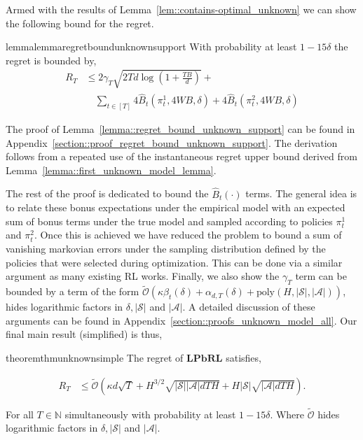Armed with the results of Lemma~\ref{lem::contains-optimal_unknown} we can show the following bound for the regret.

\begin{restatable}{lemma}{lemmaregretboundunknownsupport}\label{lemma::regret_bound_unknown_support}
With probability at least $1-15\delta$ the regret is bounded by,
\begin{align*}
    R_T &\leq 2\gamma_T \sqrt{2Td\log\left( 1 + \frac{TB}{d}\right) } + \\
    &\quad \sum_{t \in [T]} 4\widehat{B}_t(\pi_t^1, 4WB, \delta) + 4\widehat{B}_t(\pi_t^2, 4WB, \delta)
\end{align*}

\end{restatable}

The proof of Lemma~\ref{lemma::regret_bound_unknown_support} can be found in Appendix~\ref{section::proof_regret_bound_unknown_support}. The derivation follows from a repeated use of the instantaneous regret upper bound derived from Lemma~\ref{lemma::first_unknown_model_lemma}.  

The rest of the proof is dedicated to bound the $\widehat{B}_t( \cdot )$ terms. The general idea is to relate these bonus expectations under the empirical model with an expected sum of bonus terms under the true model and sampled according to policies $\pi_t^1$ and $\pi_t^2$. Once this is achieved we have reduced the problem to bound a sum of vanishing markovian errors under the sampling distribution defined by the policies that were selected during optimization. This can be done via a similar argument as many existing RL works. Finally, we also show the $\gamma_T$ term can be bounded by a term of the form $\widetilde{\mathcal{O}}(\kappa \beta_t(\delta) + \alpha_{d,T}(\delta) + \mathrm{poly}(H, |\mathcal{S}|, |\mathcal{A}|) ) $, hides logarithmic factors in $\delta, |\mathcal{S}|$ and $|\mathcal{A}|$.  A detailed discussion of these arguments can be found in Appendix~\ref{section::proofs_unknown_model_all}. Our final main result (simplified) is thus,

\begin{restatable}[]{theorem}{thmunknownsimple}
\label{theorem:main_unknown_model_simple}
The regret of $\mathbf{LPbRL}$ satisfies, 
\begin{small}
\begin{align*}
    R_T &\leq \widetilde{\mathcal{O}}(\kappa d\sqrt{T} + H^{3/2} \sqrt{ |\mathcal{S}| |\mathcal{A}| dTH } + H|\mathcal{S}| \sqrt{ |\mathcal{A}|dTH} ).
\end{align*}\end{small}
 For all $T \in \mathbb{N}$ simultaneously with probability at least $1-15\delta$. 
Where $\widetilde{\mathcal{O}}$ hides logarithmic factors in $\delta, |\mathcal{S}|$ and $|\mathcal{A}|$.

\end{restatable}

